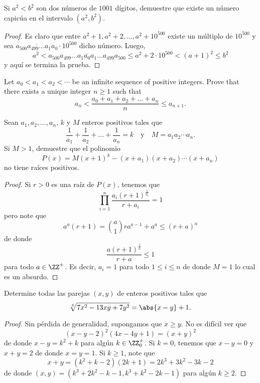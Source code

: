 \begin{probEG}
  Si $a^2<b^2$ son dos números de $1001$ dígitos, demuestre que existe un número
  capicúa en el intervalo $(a^2,b^2)$.
\end{probEG}

\begin{proof}
  Es claro que entre $a^2+1,a^2+2,\dots,a^2+10^{500}$ existe un múltiplo de
  $10^{500}$ y sea $\overline{a_{500}a_{499}\dots a_1a_0}\cdot 10^{500}$ dicho
  número. Luego,
  \[
    a^2
    <\overline{a_{500}a_{499}\dots a_1a_0a_1\dots a_{499}a_{500}}
    \le a^2+2\cdot 10^{500}
    <(a+1)^2
    \le b^2
  \]
  y aquí se termina la prueba.
\end{proof}

\begin{probEG}[IMO 2014/1]
  Let $a_0<a_1<a_2<\cdots$ be an infinite sequence of positive integers. Prove
  that there exists a unique integer $n\ge 1$ such that
  \[a_n<\frac{a_0+a_1+a_2+\dots+a_n}{n}\le a_{n+1}.\]
\end{probEG}

\begin{probEG}
  Sean $a_1,a_2,\dots,a_n$, $k$ y $M$ enteros positivos tales que
  \[
    \frac{1}{a_1}+\frac{1}{a_2}+\dots+\frac{1}{a_n}=k\quad\text{y}\quad
    M=a_1a_2\cdots a_n.
  \]
  Si $M>1$, demuestre que el polinomio
  \[P(x)=M(x+1)^k-(x+a_1)(x+a_2)\cdots(x+a_n)\]
  no tiene raíces positivos.
\end{probEG}

\begin{proof}
  Si $r>0$ es una raíz de $P(x)$, tenemos que
  \[\prod_{i=1}^n\frac{a_i(r+1)^\frac{1}{a_i}}{r+a_i}=1\]
  pero note que
  \[a^a(r+1)=\binom{a}{1}ra^{a-1}+a^a\le(r+a)^a\]
  de donde
  \[\frac{a(r+1)^\frac{1}{a}}{r+a}\le 1\]
  para todo $a\in\ZZ^+$. Es decir, $a_i=1$ para todo $1\le i\le n$ de donde
  $M=1$ lo cual es un absurdo.
\end{proof}

\begin{probEG}
  Determine todas las parejas $(x,y)$ de enteros positivos tales que
  \[\sqrt[3]{7x^2-13xy+7y^2}=\abs{x-y}+1.\]
\end{probEG}

\begin{proof}
  Sin pérdida de generalidad, supongamos que $x\ge y$. No es difícil ver que
  \[(x-y-2)^2(4x-4y+1)=(x+y)^2\]
  de donde $x-y=k^2+k$ para algún $k\in\ZZ^+_0$. Si $k=0$, tenemos que $x-y=0$ y
  $x+y=2$ de donde $x=y=1$. Si $k\ge 1$, note que
  \[x+y=(k^2+k-2)(2k+1)=2k^3+3k^2-3k-2\]
  de donde $(x,y)=(k^3+2k^2-k-1,k^3+k^2-2k-1)$ para algún $k\ge 2$.
\end{proof}


